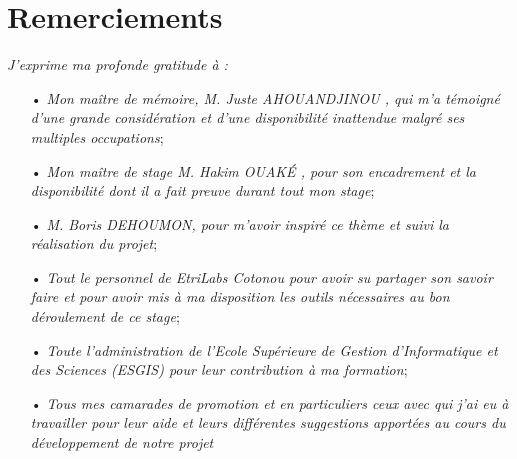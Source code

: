 \chapter{Remerciements}
\textit{J’exprime ma profonde gratitude à :}
\begin{itemize}
\item[•]\textit{Mon maître de mémoire, M. Juste AHOUANDJINOU , qui m’a témoigné d’une grande considération et d’une disponibilité inattendue malgré ses multiples occupations};
\item[•]\textit{Mon maître de stage M. Hakim OUAKÉ , pour son encadrement et la disponibilité dont il a fait preuve durant tout mon stage};
\item[•]\textit{M. Boris DEHOUMON, pour m’avoir inspiré ce thème et suivi la réalisation du projet};
\item[•]\textit{Tout le personnel de EtriLabs Cotonou pour avoir su partager son savoir faire et pour avoir mis à ma disposition les outils nécessaires au bon déroulement de ce stage};
\item[•]\textit{Toute l’administration de l'Ecole Supérieure de Gestion d'Informatique et des Sciences (ESGIS) pour leur contribution à ma formation};
\item[•]\textit{Tous mes camarades de promotion et en particuliers ceux avec qui j’ai eu à travailler pour leur aide et leurs différentes suggestions apportées au cours du développement de notre projet}
\end{itemize}
 